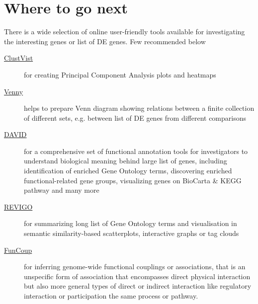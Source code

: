 \documentclass[12pt]{article}
\begin{document}
\section{Where to go next}
There is a wide selection of online user-friendly tools available for investigating the interesting genes or list of DE genes. Few recommended below 
\begin{description}
  \item[\href{hhttp://biit.cs.ut.ee/clustvis/}{ClustVist}] for creating Principal Component Analysis plots and heatmaps
  \item[\href{http://bioinfogp.cnb.csic.es/tools/venny/}{Venny}] helps to prepare Venn diagram showing relations between a finite collection of different sets, e.g. between list of DE genes from different comparisons
  \item[\href{https://david.ncifcrf.gov}{DAVID}] for a comprehensive set of functional annotation tools for investigators to understand biological meaning behind large list of genes, including identification of enriched Gene Ontology terms, discovering enriched functional-related gene groups, visualizing genes on BioCarta \& KEGG pathway and many more
  \item[\href{http://revigo.irb.hr}{REVIGO}] for summarizing long list of Gene Ontology terms and visualisation in semantic similarity-based scatterplots, interactive graphs or tag clouds
  \item[\href{http://funcoup.sbc.su.se/}{FunCoup}] for inferring genome-wide functional couplings or associations, that is an unspecific form of association that encompasses direct physical interaction but also more general types of direct or indirect interaction like regulatory interaction or participation the same process or pathway.
\end{description}
\end{document}
